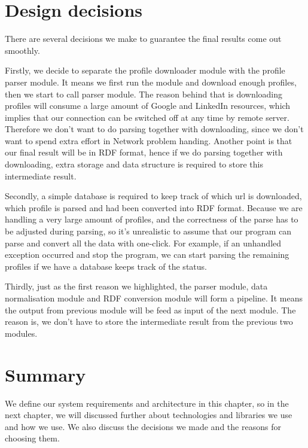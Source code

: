 \section{Design decisions}

There are several decisions we make to guarantee the final results come out smoothly.

Firstly, we decide to separate the profile downloader module with the profile parser module. It means we first run the module and download enough profiles, then we start to call parser module. The reason behind that is downloading profiles will consume a large amount of Google and LinkedIn resources, which implies that our connection can be switched off at any time by remote server. Therefore we don't want to do parsing together with downloading, since we don't want to spend extra effort in Network problem handing. Another point is that our final result will be in RDF format, hence if we do parsing together with downloading, extra storage and data structure is required to store this intermediate result.

Secondly, a simple database is required to keep track of which url is downloaded, which profile is parsed and had been converted into RDF format. Because we are handling a very large amount of profiles, and the correctness of the parse has to be adjusted during parsing, so it's unrealistic to assume that our program can parse and convert all the data with one-click. For example, if an unhandled exception occurred and stop the program, we can start parsing the remaining profiles if we have a database keeps track of the status.

Thirdly, just as the first reason we highlighted, the parser module, data normalisation module and RDF conversion module will form a pipeline. It means the output from previous module will be feed as input of the next module. The reason is, we don't have to store the intermediate result from the previous two modules.

\section{Summary}
We define our system requirements and architecture in this chapter, so in the next chapter, we will discussed further about technologies and libraries we use and how we use. We also discuss the decisions we made and the reasons for choosing them.